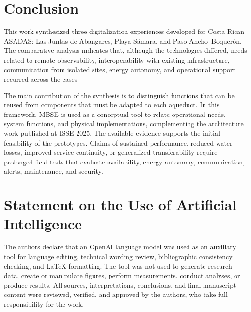 \documentclass[conference]{IEEEtran}
\begin{document}
\section{Conclusion}
This work synthesized three digitalization experiences developed for Costa Rican ASADAS: Las Juntas de Abangares, Playa Sámara, and Paso Ancho--Boquerón. The comparative analysis indicates that, although the technologies differed, needs related to remote observability, interoperability with existing infrastructure, communication from isolated sites, energy autonomy, and operational support recurred across the cases.

The main contribution of the synthesis is to distinguish functions that can be reused from components that must be adapted to each aqueduct. In this framework, MBSE is used as a conceptual tool to relate operational needs, system functions, and physical implementations, complementing the architecture work published at ISSE 2025. The available evidence supports the initial feasibility of the prototypes. Claims of sustained performance, reduced water losses, improved service continuity, or generalized transferability require prolonged field tests that evaluate availability, energy autonomy, communication, alerts, maintenance, and security.

\section*{Statement on the Use of Artificial Intelligence}
The authors declare that an OpenAI language model was used as an auxiliary tool for language editing, technical wording review, bibliographic consistency checking, and LaTeX formatting. The tool was not used to generate research data, create or manipulate figures, perform measurements, conduct analyses, or produce results. All sources, interpretations, conclusions, and final manuscript content were reviewed, verified, and approved by the authors, who take full responsibility for the work.
\end{document}
